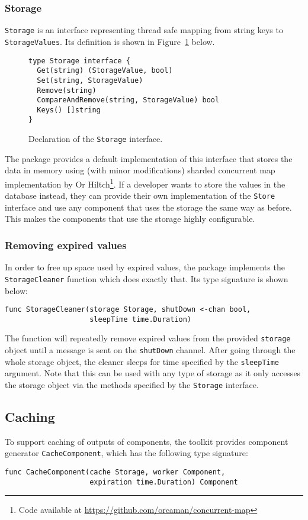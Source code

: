\subsubsection{Storage}
\texttt{Storage} is an interface representing thread safe mapping from string keys
to \texttt{StorageValues}. Its definition is shown in Figure~\ref{fig:Storage} below.
\begin{figure}[h]
\centering
\begin{lstlisting}
type Storage interface {
  Get(string) (StorageValue, bool)
  Set(string, StorageValue)
  Remove(string)
  CompareAndRemove(string, StorageValue) bool
  Keys() []string
}
\end{lstlisting}
\caption[scale=1.0]{Declaration of the \texttt{Storage} interface.}
\label{fig:Storage}
\end{figure}
The package provides a default implementation of this interface that
stores the data in memory using (with minor modifications) sharded concurrent map implementation
by Or Hiltch\footnote{Code available at \url{https://github.com/orcaman/concurrent-map}}.
If a developer wants to store the values in the 
database instead, they can provide their own implementation of the 
\texttt{Store} interface
and use any component that uses the storage the same way as before.
This makes the components that use the storage highly configurable.

\subsubsection{Removing expired values}
In order to free up space used by expired values, the package implements the
\texttt{StorageCleaner} function which does exactly that. Its type signature
is shown below:
\begin{lstlisting}
func StorageCleaner(storage Storage, shutDown <-chan bool, 
                    sleepTime time.Duration)
\end{lstlisting}
The function will repeatedly remove expired values from the provided
\texttt{storage} object until a message is sent on the \texttt{shutDown}
channel. After going through the whole storage object, the cleaner 
sleeps for time specified by the \texttt{sleepTime} argument.
Note that this can be used with any type of storage as it only accesses
the storage object via the methods specified by the \texttt{Storage} 
interface.

\subsection{Caching}
To support caching of outputs of components, the toolkit provides
component generator \texttt{CacheComponent}, which has the following type
signature:
\begin{lstlisting}
func CacheComponent(cache Storage, worker Component, 
                    expiration time.Duration) Component
\end{lstlisting}

